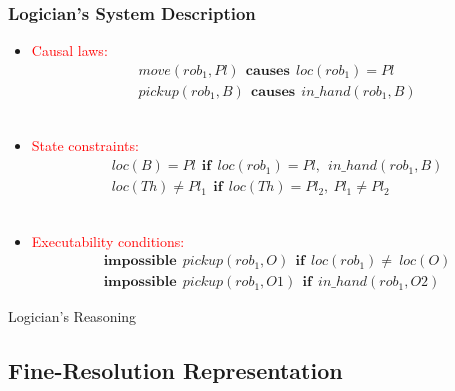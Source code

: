 \documentclass[xcolor=dvipsnames]{beamer}
\begin{document}
 \begin{frame}\frametitle{Logician's System Description}
   \begin{itemize}
   \item \textcolor{red}{Causal laws:}
     \vspace*{-1em}
     {\small
     \begin{align*}
       &move(rob_1, Pl)~~\mathbf{causes}~~loc(rob_1) = Pl \\
       &pickup(rob_1, B)~~\mathbf{causes}~~in\_hand(rob_1, B) %
     \end{align*}}%
   \ \\

   \item \textcolor{red}{State constraints:}
     \vspace*{-0.5em}
     {\small
     \begin{align*}
       &loc(B) = Pl~~\mathbf{if}~~loc(rob_1) = Pl,~~in\_hand(rob_1, B) \\
       &loc(Th) \not= Pl_1~~\mathbf{if}~~loc(Th) = Pl_2,~Pl_1\neq Pl_2 
     \end{align*}} %
   \ \\

   \item \textcolor{red}{Executability conditions:} 
     \vspace*{-0.5em}
     {\small
     \begin{align*}
       &\mathbf{impossible}~~pickup(rob_1, O)~~\mathbf{if}~~loc(rob_1) \neq ~loc(O) \\
       &\mathbf{impossible}~~pickup(rob_1, O1)~~\mathbf{if}~~in\_hand(rob_1, O2)
     \end{align*}}%

   \end{itemize}
 \end{frame}



\begin{frame}{Logician's Reasoning}



\end{frame}





\subsection{Fine-Resolution Representation}
\end{document}
